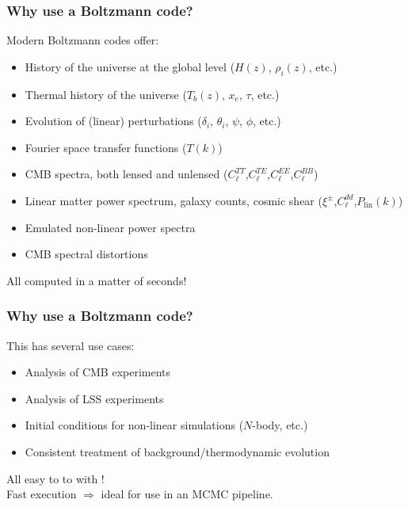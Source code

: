 \begin{frame}[fragile]
	\frametitle{Why use a Boltzmann code?}
	Modern Boltzmann codes offer:
	\vspace{0.5\baselineskip}
	\begin{itemize}
		\item History of the universe at the global level ($H(z)$, $\rho_i(z)$, etc.) \pause
		\item Thermal history of the universe ($T_b(z)$, $x_e$, $\tau$, etc.) \pause
		\item Evolution of (linear) perturbations ($\delta_i$, $\theta_i$, $\psi$, $\phi$, etc.) \pause
		\item Fourier space transfer functions ($T(k)$) \pause
		\item CMB spectra, both lensed and unlensed ($C_\ell^{TT}$,$C_\ell^{TE}$,$C_\ell^{EE}$,$C_\ell^{BB}$) \pause
		\item Linear matter power spectrum, galaxy counts, cosmic shear ($\xi^\pm$,$C_\ell^{dd}$,$P_\mathrm{lin}(k)$) \pause
		\item Emulated non-linear power spectra \pause
		\item CMB spectral distortions \pause
	\end{itemize}
	All computed in a matter of seconds!

\end{frame}

\begin{frame}[fragile]
	\frametitle{Why use a Boltzmann code?}
	This has several use cases:
	\vspace{0.5\baselineskip}
	\begin{itemize}
		\item Analysis of CMB experiments
		\item Analysis of LSS experiments
		\item Initial conditions for non-linear simulations ($N$-body, etc.)
		\item Consistent treatment of background/thermodynamic evolution
	\end{itemize}
	All easy to to with {\Red \CLASS{}}!\\
		\vspace{\baselineskip}
	Fast execution $\Rightarrow$ ideal for use in an MCMC pipeline.

\end{frame}

